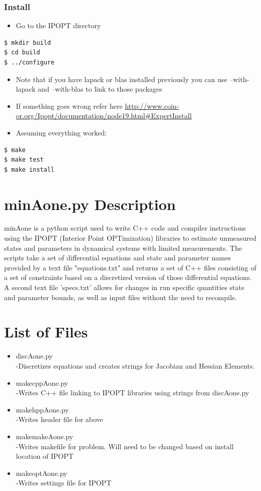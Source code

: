 \documentclass[11pt]{article}
\begin{document}
\subsubsection*{Install}
\begin{itemize}
\item Go to the IPOPT directory
\end{itemize}
\begin{verbatim}
$ mkdir build
$ cd build
$ ../configure
\end{verbatim}
\begin{itemize}
\item Note that if you have lapack or blas installed previously you can use --with-lapack and --with-blas to link to those packages
\item If something goes wrong refer here \url{http://www.coin-or.org/Ipopt/documentation/node19.html#ExpertInstall}
\item Assuming everything worked:
\end{itemize}
\begin{verbatim}
$ make
$ make test
$ make install
\end{verbatim}

\section{minAone.py Description}
minAone is a python script used to write C++ code and compiler instructions using the IPOPT (Interior Point OPTimization) libraries to estimate unmeasured states and parameters in dynamical systems with limited measurements.  The scripts take a set of differential equations and state and parameter names provided by a text file "equations.txt" and returns a set of C++ files consisting of a set of constraints based on a discretized version of those differential equations.  A second text file 'specs.txt' allows for changes in run specific quantities state and parameter bounds, as well as input files without the need to recompile.


\section*{List of Files}
\begin{itemize}
\item discAone.py\\
	-Discretizes equations and creates strings for Jacobian and Hessian Elements.
\item makecppAone.py\\
	-Writes C++ file linking to IPOPT libraries using strings from discAone.py
\item makehppAone.py\\
	-Writes header file for above
\item makemakeAone.py\\
	-Writes makefile for problem.  Will need to be changed based on install location of IPOPT
\item makeoptAone.py\\
	-Writes settings file for IPOPT
\end{itemize}
\end{document}
